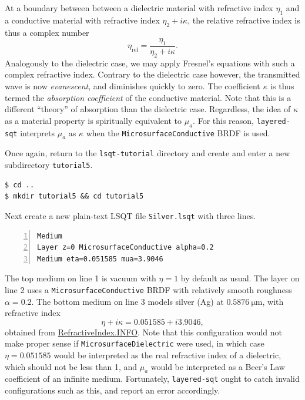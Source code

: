 \documentclass[
    twoside,
    twocolumn,
    letterpaper,
    10pt]{article}
\newcommand\namett[2]{{\color{code#1}\texttt{#2}}}
\begin{document}
At a boundary between between a dielectric material with refractive 
index $\eta_1$ and a conductive material with refractive index 
$\eta_2 + i \kappa$, the relative refractive index is thus a 
complex number
\begin{equation*}
    \eta_{\text{rel}} = \frac{\eta_1}{\eta_2 + i \kappa}.
\end{equation*}
Analogously to the dielectric case, we may apply Fresnel's 
equations with such a complex refractive index. Contrary to the
dielectric case however, the transmitted wave is now \emph{evanescent},
and diminishes quickly to zero. The coefficient $\kappa$ is thus
termed the \emph{absorption coefficient} of the conductive material. 
Note that this is a different ``theory'' of absorption
than the dielectric case. Regardless, the idea of $\kappa$ as a 
material property is spiritually equivalent to $\mu_a$.
For this reason, \texttt{layered-sqt} interprets $\mu_a$ as $\kappa$
when the \namett{purple}{MicrosurfaceConductive} BRDF is used. 

Once again, return to the \texttt{lsqt-tutorial} directory and create
and enter a new subdirectory \texttt{tutorial5}.
\begin{verbatim}
$ cd ..
$ mkdir tutorial5 && cd tutorial5
\end{verbatim}
Next create a new plain-text LSQT file \texttt{Silver.lsqt} with
three lines.
\begin{lstlisting}[numbers=left]
Medium
Layer z=0 MicrosurfaceConductive alpha=0.2
Medium eta=0.051585 mua=3.9046
\end{lstlisting}

The top medium on line 1 is vacuum with $\eta = 1$ by default as 
usual. The layer on line 2 uses a \namett{purple}{MicrosurfaceConductive} 
BRDF with relatively smooth roughness $\alpha = 0.2$. The bottom medium on 
line 3 models silver (Ag) at $\SI{0.5876}{\micro\meter}$, with refractive index
\begin{equation*}
    \eta + i\kappa = 0.051585 + i3.9046,
\end{equation*}
obtained from \href{https://refractiveindex.info}{RefractiveIndex.INFO}.
Note that this configuration would not make proper sense if 
\namett{purple}{MicrosurfaceDielectric} were used, in
which case $\eta=0.051585$ would be interpreted as the real refractive 
index of a dielectric, which should not be less than 1, and $\mu_a$ would be 
interpreted as a Beer's Law coefficient of an infinite medium. 
Fortunately, \texttt{layered-sqt} ought to catch invalid configurations such
as this, and report an error accordingly.
\end{document}

